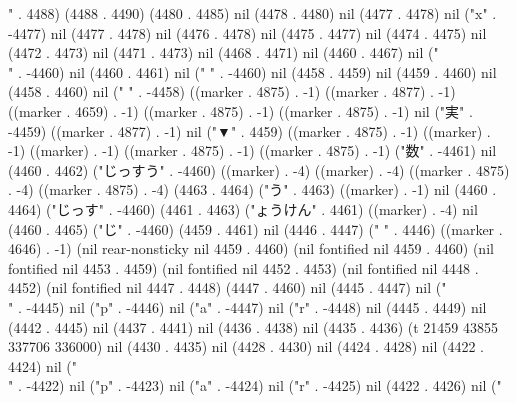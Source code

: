 {" . 4488) (4488 . 4490) (4480 . 4485) nil (4478 . 4480) nil (4477 . 4478) nil ("x" . -4477) nil (4477 . 4478) nil (4476 . 4478) nil (4475 . 4477) nil (4474 . 4475) nil (4472 . 4473) nil (4471 . 4473) nil (4468 . 4471) nil (4460 . 4467) nil ("\\" . -4460) nil (4460 . 4461) nil (" " . -4460) nil (4458 . 4459) nil (4459 . 4460) nil (4458 . 4460) nil (" " . -4458) ((marker . 4875) . -1) ((marker . 4877) . -1) ((marker . 4659) . -1) ((marker . 4875) . -1) ((marker . 4875) . -1) nil ("実" . -4459) ((marker . 4877) . -1) nil ("▼" . 4459) ((marker . 4875) . -1) ((marker) . -1) ((marker) . -1) ((marker . 4875) . -1) ((marker . 4875) . -1) ("数" . -4461) nil (4460 . 4462) ("じっすう" . -4460) ((marker) . -4) ((marker) . -4) ((marker . 4875) . -4) ((marker . 4875) . -4) (4463 . 4464) ("う" . 4463) ((marker) . -1) nil (4460 . 4464) ("じっす" . -4460) (4461 . 4463) ("ょうけん" . 4461) ((marker) . -4) nil (4460 . 4465) ("じ" . -4460) (4459 . 4461) nil (4446 . 4447) ("  " . 4446) ((marker . 4646) . -1) (nil rear-nonsticky nil 4459 . 4460) (nil fontified nil 4459 . 4460) (nil fontified nil 4453 . 4459) (nil fontified nil 4452 . 4453) (nil fontified nil 4448 . 4452) (nil fontified nil 4447 . 4448) (4447 . 4460) nil (4445 . 4447) nil ("\\" . -4445) nil ("p" . -4446) nil ("a" . -4447) nil ("r" . -4448) nil (4445 . 4449) nil (4442 . 4445) nil (4437 . 4441) nil (4436 . 4438) nil (4435 . 4436) (t 21459 43855 337706 336000) nil (4430 . 4435) nil (4428 . 4430) nil (4424 . 4428) nil (4422 . 4424) nil ("\\" . -4422) nil ("p" . -4423) nil ("a" . -4424) nil ("r" . -4425) nil (4422 . 4426) nil ("
}
